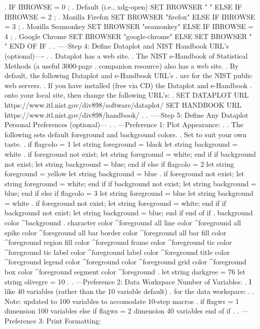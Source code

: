 .
IF IBROWSE = 0  ; . Default (i.e., xdg-open)
   SET BROWSER " "
ELSE IF IBROWSE = 2  ; . Mozilla Firefox
   SET BROWSER "firefox"
ELSE IF IBROWSE = 3  ; . Mozilla Seamonkey
   SET BROWSER "seamonkey"
ELSE IF IBROWSE = 4  ; . Google Chrome
   SET BROWSER "google-chrome"
ELSE
   SET BROWSER " "
END OF IF
.
. -----Step 4: Define Dataplot and NIST Handbook URL's (optional)----
.
.  Dataplot has a web site.
.  The NIST e-Handbook of Statistical Methods (a useful 3000-page
.  companion resource) also has a web site.
.  By default, the following Dataplot and e-Handbook URL's
.  are for the NIST public web servers.
.  If you have installed (free via CD) the Dataplot and e-Handbook
.  onto your local site, then change the following URL's:
.
SET DATAPLOT URL https://www.itl.nist.gov/div898/software/dataplot/
SET HANDBOOK URL https://www.itl.nist.gov/div898/handbook/
.
. -----Step 5: Define Any Dataplot Personal Preferences (optional)---
.
. ---Preference 1: Plot Appearance:
.
.  The following sets default foreground and background colors.
.  Set to suit your own taste.
.
if flagcolo = 1
   let string foreground = black
   let string background = white
   .
   if foreground not exist; let string foreground = white; end if
   if background not exist; let string background = blue; end if
else if flagcolo = 2
   let string foreground = yellow
   let string background = blue
   .
   if foreground not exist; let string foreground = white; end if
   if background not exist; let string background = blue; end if
else if flagcolo = 3
   let string foreground = blue
   let string background = white
   .
   if foreground not exist; let string foreground = white; end if
   if background not exist; let string background = blue; end if
end of if
.
background color ^background
.
character color ^foreground all
line color ^foreground all
spike color ^foreground all
bar border color ^foreground all
bar fill color ^foreground
region fill color ^foreground
frame color ^foreground
tic color ^foreground
tic label color ^foreground
label color ^foreground
title color ^foreground
legend color ^foreground
color ^foreground
grid color ^foreground
box color ^foreground
segment color ^foreground
.
let string darkgree = 76
let string olivegre = 10
.
. ---Preference 2: Data Workspace Number of Variables:
.    I like 40 variables (rather than the 10 variable default)
.    for the data workspace:
.
.    Note: updated to 100 variables to accomodate 10-step macros
.
if flagws = 1
   dimension 100 variables
else if flagws = 2
   dimension 40 variables
end of if
.
. ---Preference 3: Print Formatting:
